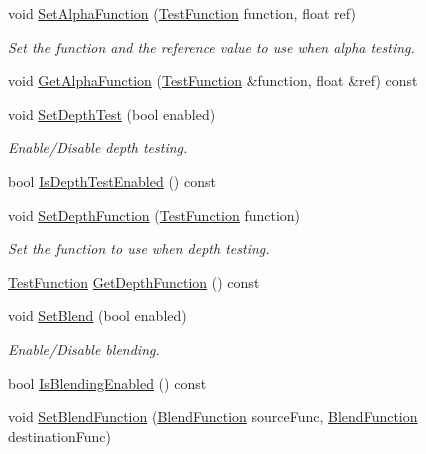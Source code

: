 \begin{DoxyCompactItemize}
\item 
void \hyperlink{class_g_f_w_1_1_context_state_a050bc15d46f42296f22cbcb0eaf07711}{Set\+Alpha\+Function} (\hyperlink{namespace_g_f_w_a2eabb5a646179bceaab2d5e3bfce2316}{Test\+Function} function, float ref)
\begin{DoxyCompactList}\small\item\em Set the function and the reference value to use when alpha testing. \end{DoxyCompactList}\item 
void \hyperlink{class_g_f_w_1_1_context_state_a52d1f42170e2e2e6018307f09f27492a}{Get\+Alpha\+Function} (\hyperlink{namespace_g_f_w_a2eabb5a646179bceaab2d5e3bfce2316}{Test\+Function} \&function, float \&ref) const
\item 
void \hyperlink{class_g_f_w_1_1_context_state_aa4dc94bfca31669f31ab8953a06ca456}{Set\+Depth\+Test} (bool enabled)
\begin{DoxyCompactList}\small\item\em Enable/\+Disable depth testing. \end{DoxyCompactList}\item 
bool \hyperlink{class_g_f_w_1_1_context_state_a02f2fbadaa17c84b40a930202844bd97}{Is\+Depth\+Test\+Enabled} () const
\item 
void \hyperlink{class_g_f_w_1_1_context_state_aa0d4ecd0d061a53edb09a30e5b8142eb}{Set\+Depth\+Function} (\hyperlink{namespace_g_f_w_a2eabb5a646179bceaab2d5e3bfce2316}{Test\+Function} function)
\begin{DoxyCompactList}\small\item\em Set the function to use when depth testing. \end{DoxyCompactList}\item 
\hyperlink{namespace_g_f_w_a2eabb5a646179bceaab2d5e3bfce2316}{Test\+Function} \hyperlink{class_g_f_w_1_1_context_state_ab07db17bd0d1ecc225e9e5902a5fbfdb}{Get\+Depth\+Function} () const
\item 
void \hyperlink{class_g_f_w_1_1_context_state_adfdffbd81d730021f511e4912ce2da27}{Set\+Blend} (bool enabled)
\begin{DoxyCompactList}\small\item\em Enable/\+Disable blending. \end{DoxyCompactList}\item 
bool \hyperlink{class_g_f_w_1_1_context_state_a575b9362eefb1c7b16f82236a5a963cd}{Is\+Blending\+Enabled} () const
\item 
void \hyperlink{class_g_f_w_1_1_context_state_ab2f28c92d5d196ab04c085b3a519fd10}{Set\+Blend\+Function} (\hyperlink{namespace_g_f_w_ac19434e926d01e02140f07e74ff36f3c}{Blend\+Function} source\+Func, \hyperlink{namespace_g_f_w_ac19434e926d01e02140f07e74ff36f3c}{Blend\+Function} destination\+Func)

\end{DoxyCompactItemize}
